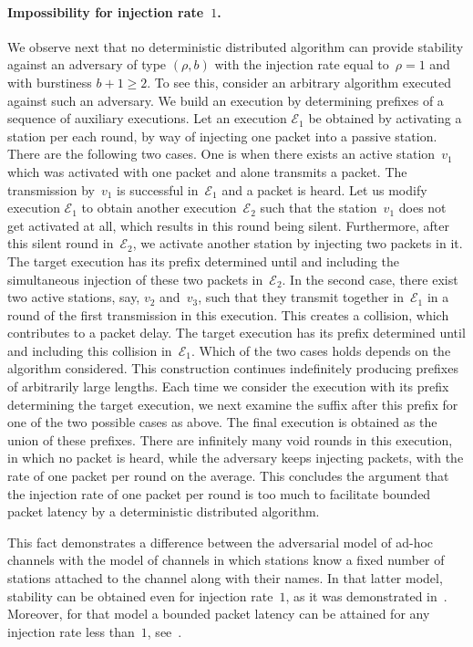 \documentclass[11pt]{article}
\newcommand{\BBB}{\vspace*{-\bigskipamount}}
\newcommand{\cE}{{\mathcal E}}
\newcommand{\Paragraph}[1]{\BBB\paragraph{#1}}
\begin{document}
\Paragraph{Impossibility for injection rate~$1$.}


We observe next that no deterministic distributed algorithm can provide stability against an adversary of type $(\rho,b)$ with the injection rate equal to~$\rho=1$ and with burstiness $b+1\ge 2$.
To see this, consider an arbitrary algorithm executed against such an adversary.
We build an execution by determining prefixes of a sequence of auxiliary executions.
Let an execution $\cE_1$ be obtained by activating a station per each round, by way of injecting one packet into a passive station.
There are the following two cases.
One is when there exists an active station~$v_1$ which was activated with one packet and alone transmits a packet.
The transmission by~$v_1$ is successful in~$\cE_1$ and a packet is heard.
Let us modify execution $\cE_1$ to obtain another execution~$\cE_2$ such that the station~$v_1$ does not get activated at all, which results in this round being silent.
Furthermore, after this silent round in~$\cE_2$, we activate another station  by injecting two packets in it.
The target execution has its prefix determined until and including the simultaneous injection of these two packets in~$\cE_2$.
In the second case, there exist two active stations, say, $v_2$ and~$v_3$, such that they transmit together in~$\cE_1$ in a round of the first transmission in this execution.
This creates a collision, which contributes to a packet delay.
The target execution has its prefix determined until and including this collision in~$\cE_1$.
Which of the two cases holds depends on the algorithm considered.
This construction continues indefinitely producing prefixes of arbitrarily large lengths.
Each time we consider the execution with its prefix determining the target execution, we next examine the suffix after this prefix for one of the two possible cases as above.
The final execution is obtained as the union of these prefixes.
There are infinitely many void rounds in this execution, in which no packet is heard, while the adversary keeps injecting packets, with the rate of one packet per round on the average.
This concludes the argument that the injection rate of one packet per round is too much to facilitate  bounded packet latency by a deterministic distributed algorithm.

This fact  demonstrates a difference between the adversarial model of ad-hoc channels with the model of channels in which  stations know a fixed number of stations attached to the channel along with their names.
In that latter model,  stability can be obtained even for  injection rate~$1$, as it was demonstrated in~\cite{ChlebusKR09}.
Moreover, for that model a bounded packet latency can be attained for any injection rate less than~$1$, see~\cite{AnantharamuCKR-INFOCOM10,AnantharamuCKR-SIROCCO11}.
\end{document}
